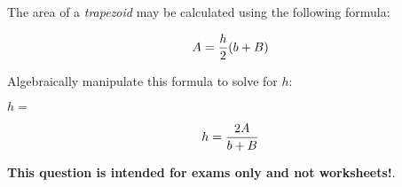 

The area of a {\it trapezoid} may be calculated using the following formula:

$$A = {h \over 2} (b + B)$$

Algebraically manipulate this formula to solve for $h$:

\vskip 20pt

$h = $







$$h = {2 A \over b + B}$$







{\bf This question is intended for exams only and not worksheets!}.



